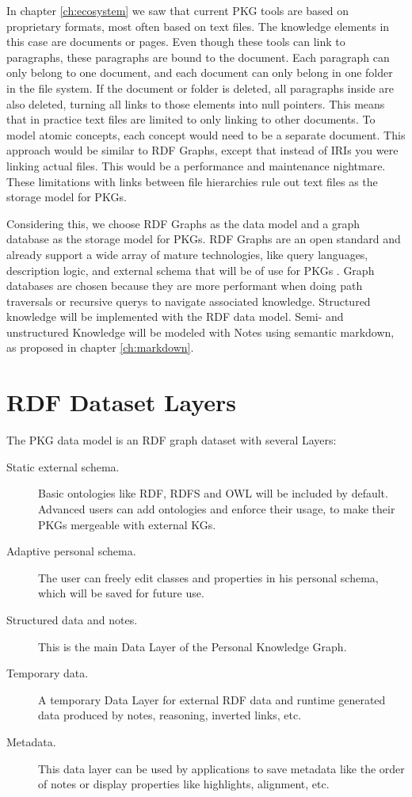 In chapter \ref{ch:ecosystem} we saw that current PKG tools are based on proprietary formats, most often based on text files. The knowledge elements in this case are documents or pages. Even though these tools can link to paragraphs, these paragraphs are bound to the document. Each paragraph can only belong to one document, and each document can only belong in one folder in the file system. If the document or folder is deleted, all paragraphs inside are also deleted, turning all links to those elements into null pointers. This means that in practice text files are limited to only linking to other documents. To model atomic concepts, each concept would need to be a separate document. This approach would be similar to RDF Graphs, except that instead of IRIs you were linking actual files. This would be a performance and maintenance nightmare. These limitations with links between file hierarchies rule out text files as the storage model for PKGs.

Considering this, we choose RDF Graphs as the data model and a graph database as the storage model for PKGs. RDF Graphs are an open standard and already support a wide array of mature technologies, like query languages, description logic, and external schema that will be of use for PKGs \cite{sparql, owl}. Graph databases are chosen because they are more performant when doing path traversals or recursive querys to navigate associated knowledge. Structured knowledge will be implemented with the RDF data model. Semi- and unstructured Knowledge will be modeled with Notes using semantic markdown, as proposed in chapter \ref{ch:markdown}.

\section{RDF Dataset Layers}

The PKG data model is an RDF graph dataset with several Layers:

\begin{description}
  \item[Static external schema.] Basic ontologies like RDF, RDFS and OWL will be included by default. Advanced users can add ontologies and enforce their usage, to make their PKGs mergeable with external KGs.

  \item[Adaptive personal schema.] The user can freely edit classes and properties in his personal schema, which will be saved for future use.

  \item[Structured data and notes.] This is the main Data Layer of the Personal Knowledge Graph.

  \item[Temporary data.] A temporary Data Layer for external RDF data and runtime generated data produced by notes, reasoning, inverted links, etc.

  \item[Metadata.] This data layer can be used by applications to save metadata like the order of notes or display properties like highlights, alignment, etc.
\end{description}






